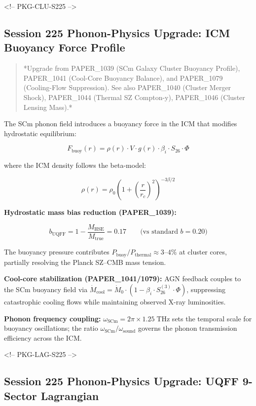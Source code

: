 \documentclass[11pt]{article}
\begin{document}
<!-- PKG-CLU-S225 -->

\subsection*{Session 225 Phonon-Physics Upgrade: ICM Buoyancy Force Profile}

\begin{quote}
*Upgrade from PAPER\_1039 (SCm Galaxy Cluster Buoyancy Profile),
PAPER\_1041 (Cool-Core Buoyancy Balance), and PAPER\_1079 (Cooling-Flow
Suppression).  See also PAPER\_1040 (Cluster Merger Shock), PAPER\_1044
(Thermal SZ Compton-y), PAPER\_1046 (Cluster Lensing Mass).*
\end{quote}

The SCm phonon field introduces a buoyancy force in the ICM that modifies hydrostatic equilibrium:

$$F_{\text{buoy}}(r) = \rho(r) \cdot V \cdot g(r) \cdot \beta_i \cdot S_{26} \cdot \Phi$$

where the ICM density follows the beta-model:

$$\rho(r) = \rho_0 \left(1 + \left(\frac{r}{r_c}\right)^2\right)^{-3\beta/2}$$

\textbf{Hydrostatic mass bias reduction (PAPER\_1039):}

$$b_{\text{UQFF}} = 1 - \frac{M_{\text{HSE}}}{M_{\text{true}}} = 0.17 \qquad \text{(vs standard } b = 0.20\text{)}$$

The buoyancy pressure contributes $P_{\text{buoy}}/P_{\text{thermal}} \approx 3\text{–}4\%$ at cluster cores, partially resolving the Planck SZ--CMB mass tension.

\textbf{Cool-core stabilization (PAPER\_1041/1079):} AGN feedback couples to the SCm buoyancy field via $\dot{M}_{\text{cool}} = \dot{M}_0 \cdot (1 - \beta_i \cdot S_{26}^{(3)} \cdot \Phi)$, suppressing catastrophic cooling flows while maintaining observed X-ray luminosities.

\textbf{Phonon frequency coupling:} $\omega_{\text{SCm}} = 2\pi \times 1.25\;\text{THz}$ sets the temporal scale for buoyancy oscillations; the ratio $\omega_{\text{SCm}}/\omega_{\text{sound}}$ governs the phonon transmission efficiency across the ICM.

<!-- PKG-LAG-S225 -->

\subsection*{Session 225 Phonon-Physics Upgrade: UQFF 9-Sector Lagrangian}
\end{document}
